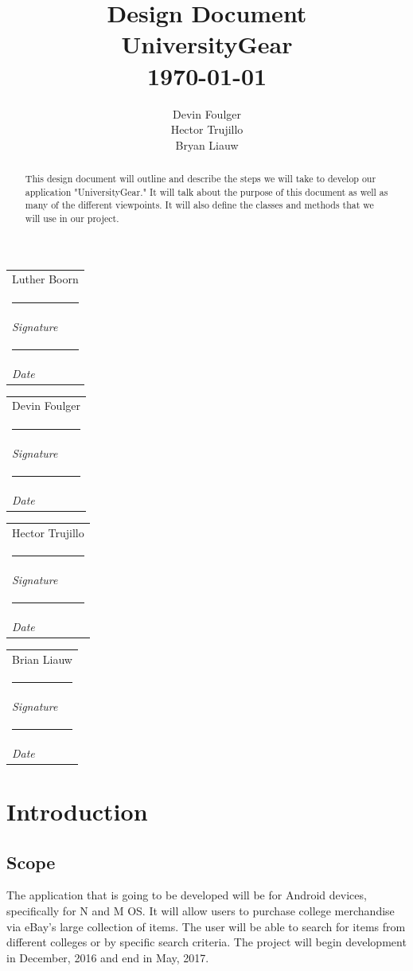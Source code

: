 \documentclass[journal,compsoc, 10pt, draftclsnofoot, onecolumn]{IEEEtran}
\makeatletter
\newcommand{\namesigdate}[2][6cm]{%
  \begin{tabular}{@{}p{#1}@{}}
    #2 \\[0.5\normalbaselineskip] \hrule \\[0.pt]
    {\small \textit{Signature}} \\[0.5\normalbaselineskip] \hrule \\[0pt]
    {\small \textit{Date}}
  \end{tabular}
}
\makeatother
\begin{document}
\title{\vspace{20em}Design Document \\{\vspace{-1ex}\huge UniversityGear} \\
{\large \today}}
\author{\vspace{10ex}Devin Foulger \\{\vspace{-1ex}Hector Trujillo}
\\{\vspace{-1ex}Bryan Liauw}}

\begin{titlepage}

\maketitle
\thispagestyle{empty}

\begin{abstract}
This design document will outline and describe the steps we will take to develop 
our application "UniversityGear."  It will talk about the purpose of this 
document as well as many of the different viewpoints. It will also define 
the classes and methods that we will use in our project. 
\end{abstract}

\vspace{2ex}\noindent 
\namesigdate{Luther Boorn} \hfill
\namesigdate{Devin Foulger} \hfill

\vspace{4ex}\noindent
\namesigdate{Hector Trujillo} \hfill
\namesigdate{Brian Liauw} \hfill

\end{titlepage}

\tableofcontents


\section{Introduction}
\subsection{Scope}
The application that is going to be developed will be for Android devices, 
specifically for N and M OS. It will allow users to purchase college merchandise
 via eBay's large collection of items. The user will be able to search for items
 from different colleges or by specific search criteria. The project will begin 
development in December, 2016 and end in May, 2017.
\end{document}
